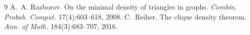 \documentclass[11pt]{article}
\theoremstyle{remark}
\begin{document}
\begin{thebibliography}{9}
 A.~A. Razborov. On the minimal density of triangles in graphs. \emph{Combin. Probab. Comput.} 17(4):603--618, 2008.
 C.~Reiher. The clique density theorem. \emph{Ann. of Math.} 184(3):683--707, 2016.
\end{thebibliography}
\end{document}
